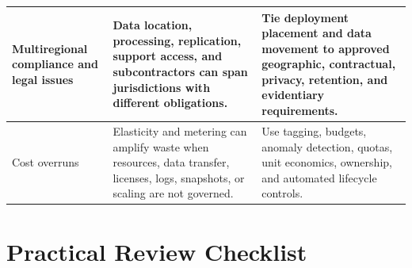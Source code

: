 \documentclass[11pt]{article}
\begin{document}
\begin{longtable}{@{}>{\RaggedRight\arraybackslash}p{}>{\RaggedRight\arraybackslash}p{}>{\RaggedRight\arraybackslash}p{}@{}}
Multiregional compliance and legal issues & Data location, processing, replication, support access, and subcontractors can span jurisdictions with different obligations. & Tie deployment placement and data movement to approved geographic, contractual, privacy, retention, and evidentiary requirements. \\\midrule
Cost overruns & Elasticity and metering can amplify waste when resources, data transfer, licenses, logs, snapshots, or scaling are not governed. & Use tagging, budgets, anomaly detection, quotas, unit economics, ownership, and automated lifecycle controls. \\\midrule
\bottomrule
\end{longtable}
\endgroup
\section{Practical Review Checklist}
\end{document}
